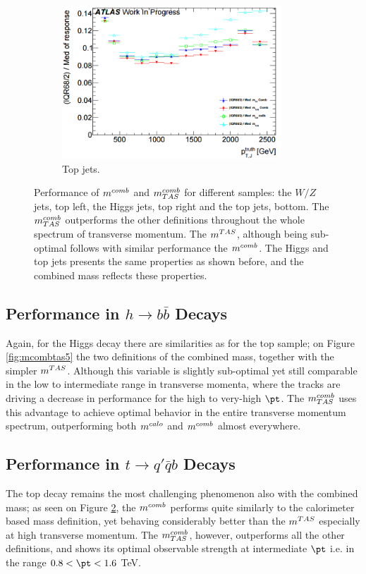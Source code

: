 \begin{figure}
    \begin{subfigure}[b]{0.45\textwidth}
  \centering
      \includegraphics[width=0.9\textwidth]{jet_part/mcomb/mcombtas4.png}
  \caption[$\mcombtas$ on the boosted tops]{Top jets.}
  \label{fig:mcombtas4}
    \end{subfigure}
\caption{Performance of $m^{comb}$ and $\mcombtas$ for different samples: the $W/Z$ jets, top left, the Higgs jets, top right and the top jets, bottom. The $\mcombtas$ outperforms the other definitions throughout the whole spectrum of transverse momentum. The $m^{TAS}$, although being sub-optimal follows with similar performance the $m^{comb}$. The Higgs and top jets presents the same properties as shown before, and the combined mass reflects these properties. }
\end{figure}

\subsection{Performance in $h\to b\bar{b}$ Decays}
Again, for the Higgs decay there are similarities as for the top sample; on Figure \ref{fig:mcombtas5} the two definitions of the combined mass, together with the simpler $m^{TAS}$. Although this variable is slightly sub-optimal yet still comparable in the low to intermediate range in transverse momenta, where the tracks are driving a decrease in performance for the high to very-high $\pt$. The $\mcombtas$ uses this advantage to achieve optimal behavior in the entire transverse momentum spectrum, outperforming both $m^{calo}$ and $m^{comb}$ almost everywhere.


\subsection{Performance in $t\to q'\bar{q}b$ Decays}
The top decay remains the most challenging phenomenon also with the combined mass; as seen on Figure \ref{fig:mcombtas4}, the $m^{comb}$ performs quite similarly to the calorimeter based mass definition, yet behaving considerably better than the $m^{TAS}$ especially at high transverse momentum. The $\mcombtas$, however, outperforms all the other definitions, and shows its optimal observable strength at intermediate $\pt$ i.e. in the range $0.8 < \pt < 1.6$ TeV.


